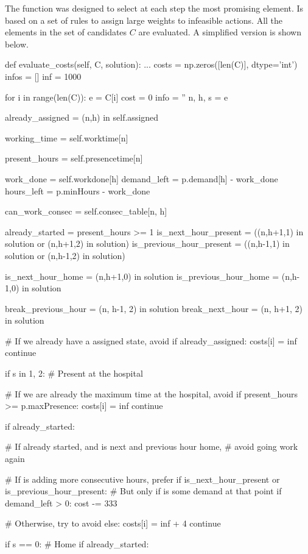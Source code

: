 \documentclass[12pt,a4paper]{article}
\begin{document}
The function was designed to select at each step the most promising element. Is 
based on a set of rules to assign large weights to infeasible actions. All the 
elements in the set of candidates $C$ are evaluated. A simplified version is 
shown below.
%
\begin{pycode}
	def evaluate_costs(self, C, solution):
		...
		costs = np.zeros([len(C)], dtype='int')
		infos = []
		inf = 1000

		for i in range(len(C)):
			e = C[i]
			cost = 0
			info = ''
			n, h, s = e

			already_assigned = (n,h) in self.assigned

			working_time = self.worktime[n]

			present_hours = self.presencetime[n]

			work_done = self.workdone[h]
			demand_left = p.demand[h] - work_done
			hours_left = p.minHours - work_done

			can_work_consec = self.consec_table[n, h]

			already_started = present_hours >= 1
			is_next_hour_present = ((n,h+1,1) in solution 
				or (n,h+1,2) in solution)
			is_previous_hour_present = ((n,h-1,1) in solution 
				or (n,h-1,2) in solution)

			is_next_hour_home = (n,h+1,0) in solution
			is_previous_hour_home = (n,h-1,0) in solution

			break_previous_hour = (n, h-1, 2) in solution
			break_next_hour = (n, h+1, 2) in solution

			# If we already have a assigned state, avoid
			if already_assigned:
				costs[i] = inf
				continue

			if s in {1, 2}: # Present at the hospital

				# If we are already the maximum time at the hospital, avoid
				if present_hours >= p.maxPresence:
					costs[i] = inf
					continue

				if already_started:

					# If already started, and is next and previous hour home,
					# avoid going work again

					# If is adding more consecutive hours, prefer
					if is_next_hour_present or is_previous_hour_present:
						# But only if is some demand at that point
						if demand_left > 0:
							cost -= 333

					# Otherwise, try to avoid
					else:
						costs[i] = inf + 4
						continue

			if s == 0: # Home
				if already_started:


\end{pycode}
\end{document}
